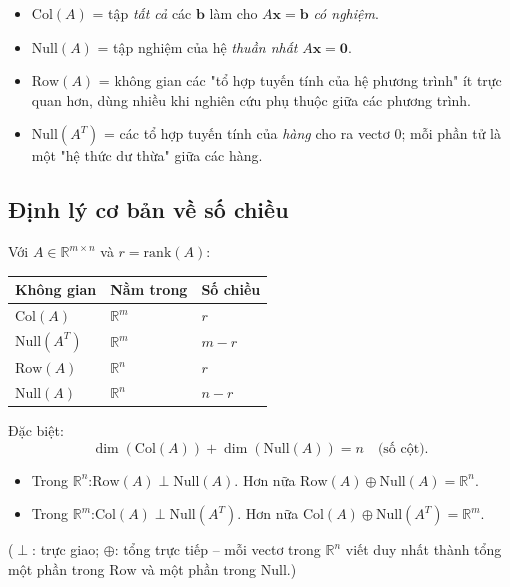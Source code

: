 \documentclass[12pt,a4paper]{article}
\begin{document}
\begin{ynghia}[title={Ý nghĩa từng không gian}]
\begin{itemize}
  \item $\mathrm{Col}(A)$ = tập \emph{tất cả} các $\mathbf{b}$ làm cho $A\mathbf{x} = \mathbf{b}$ \emph{có nghiệm}.
  \item $\mathrm{Null}(A)$ = tập nghiệm của hệ \emph{thuần nhất} $A\mathbf{x} = \mathbf{0}$.
  \item $\mathrm{Row}(A)$ = không gian các "tổ hợp tuyến tính của hệ phương trình" ít trực quan hơn, dùng nhiều khi nghiên cứu phụ thuộc giữa các phương trình.
  \item $\mathrm{Null}(A^T)$ = các tổ hợp tuyến tính của \emph{hàng} cho ra vectơ 0; mỗi phần tử là một "hệ thức dư thừa" giữa các hàng.
\end{itemize}
\end{ynghia}

\subsection{Định lý cơ bản về số chiều}

\begin{dinhly}[title={Định lý hạng-nhân (Rank-Nullity)}]
Với $A \in \mathbb{R}^{m\times n}$ và $r = \mathrm{rank}(A)$:
\begin{center}
\begin{tabular}{lll}
\toprule
Không gian & Nằm trong & Số chiều \\
\midrule
$\mathrm{Col}(A)$    & $\mathbb{R}^m$ & $r$ \\
$\mathrm{Null}(A^T)$ & $\mathbb{R}^m$ & $m - r$ \\
$\mathrm{Row}(A)$    & $\mathbb{R}^n$ & $r$ \\
$\mathrm{Null}(A)$   & $\mathbb{R}^n$ & $n - r$ \\
\bottomrule
\end{tabular}
\end{center}
Đặc biệt:
\[
  \boxed{\dim(\mathrm{Col}(A)) + \dim(\mathrm{Null}(A)) = n}\quad \text{(số cột)}.
\]
\end{dinhly}

\begin{dinhly}[title={Quan hệ trực giao -- Định lý cơ bản của ĐSTT}]
\begin{itemize}
  \item Trong $\mathbb{R}^n$:\quad $\mathrm{Row}(A) \perp \mathrm{Null}(A)$. Hơn nữa $\mathrm{Row}(A) \oplus \mathrm{Null}(A) = \mathbb{R}^n$.
  \item Trong $\mathbb{R}^m$:\quad $\mathrm{Col}(A) \perp \mathrm{Null}(A^T)$. Hơn nữa $\mathrm{Col}(A) \oplus \mathrm{Null}(A^T) = \mathbb{R}^m$.
\end{itemize}
($\perp$: trực giao; $\oplus$: tổng trực tiếp -- mỗi vectơ trong $\mathbb{R}^n$ viết duy nhất thành tổng một phần trong $\mathrm{Row}$ và một phần trong $\mathrm{Null}$.)
\end{dinhly}
\end{document}
